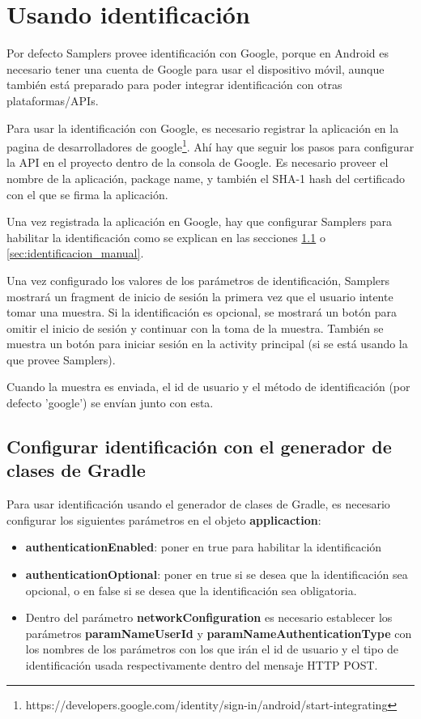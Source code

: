 \section{Usando identificación} \label{sec:usando_autenticacion}
Por defecto Samplers provee identificación con Google, porque en Android es necesario tener una cuenta de Google para usar el dispositivo móvil, aunque también está preparado para poder integrar identificación con otras plataformas/APIs.

Para usar la identificación con Google, es necesario registrar la aplicación en la pagina de desarrolladores de google\footnote{https://developers.google.com/identity/sign-in/android/start-integrating}. Ahí hay que seguir los pasos para configurar la API en el proyecto dentro de la consola de Google. Es necesario proveer el nombre de la aplicación, package name, y también el SHA-1 hash del certificado con el que se firma la aplicación.

Una vez registrada la aplicación en Google, hay que configurar Samplers para habilitar la identificación como se explican en las secciones \ref{sec:identificacion_gradle} o \ref{sec:identificacion_manual}.

Una vez configurado los valores de los parámetros de identificación, Samplers mostrará un fragment de inicio de sesión la primera vez que el usuario intente tomar una muestra. Si la identificación es opcional, se mostrará un botón para omitir el inicio de sesión y continuar con la toma de la muestra. También se muestra un botón para iniciar sesión en la activity principal (si se está usando la que provee Samplers).

Cuando la muestra es enviada, el id de usuario y el método de identificación (por defecto 'google') se envían junto con esta.


\subsection{Configurar identificación con el generador de clases de Gradle} \label{sec:identificacion_gradle}

Para usar identificación usando el generador de clases de Gradle, es necesario configurar los siguientes parámetros en el objeto \textbf{applicaction}:

\begin{itemize}

	\item \textbf{authenticationEnabled}: poner en true para habilitar la identificación
		
	\item \textbf{authenticationOptional}: poner en true si se desea que la identificación sea opcional, o en false si se desea que la identificación sea obligatoria.
	
	\item Dentro del parámetro \textbf{networkConfiguration} es necesario establecer los parámetros \textbf{paramNameUserId} y \textbf{paramNameAuthenticationType} con los nombres de los parámetros con los que irán el id de usuario y el tipo de identificación usada respectivamente dentro del mensaje HTTP POST.
	

\end{itemize}

